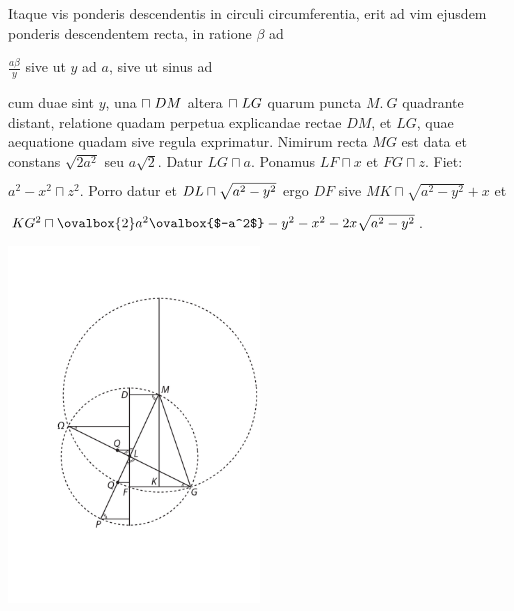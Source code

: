 \pstart Itaque vis ponderis\protect{} descendentis in circuli circumferentia, erit ad vim ejusdem ponderis descendentem recta, in ratione $\beta$ ad \rule[-4mm]{0mm}{10mm}$\displaystyle\frac{a \beta}{y}$ sive ut $y$ ad $a$, sive ut sinus ad \rule[-4mm]{0mm}{10mm}\rule[-4mm]{0mm}{10mm} cum duae sint $y$, una $\sqcap \hspace{1mm}DM$ altera $\sqcap \hspace{1mm}LG$ quarum puncta $M.\ G$ quadrante distant, relatione quadam perpetua explicandae rectae $DM$, et $LG$, quae aequatione quadam sive regula exprimatur. Nimirum recta $MG$ est data et constans $\surd{2a^2}$ seu $a\surd{2}$. 
\pend 
\pstart Datur $LG \sqcap a$. Ponamus $LF \sqcap x$ et $FG \sqcap z$. Fiet: $a^2-x^2 \sqcap z^2$. Porro datur  et $DL \rule[-4mm]{0mm}{10mm} \sqcap \sqrt{a^2 - y^2}$ ergo $DF$ sive $MK \sqcap \sqrt{a^2 - y^2} + x$ et $KG^2 \sqcap \ovalbox{2} a^2 \ovalbox{$-a^2$} -y^2 -x^2 -2x \sqrt{a^2 - y^2}$. 
\pend
\vspace{1.5em}
\pstart
\begin{center}                    
\includegraphics[width=0.5\textwidth]{images/lh0351009_003r_2-d4.pdf}\\
\end{center}
